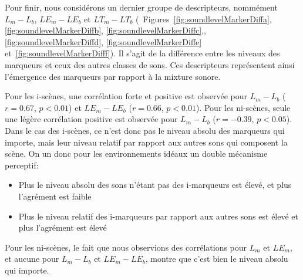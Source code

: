 Pour finir, nous considérons un dernier groupe de descripteurs, nommément $L_m-L_b$, $LE_m-LE_b$ et $LT_m-LT_b$ (\Cf~Figures~\ref{fig:soundlevelMarkerDiffa}, \ref{fig:soundlevelMarkerDiffb}, \ref{fig:soundlevelMarkerDiffc},, \ref{fig:soundlevelMarkerDiffd}, \ref{fig:soundlevelMarkerDiffe} et~\ref{fig:soundlevelMarkerDifff}). Il s'agit de la différence entre les niveaux des marqueurs et ceux des autres classes de sons. Ces descripteurs représentent ainsi l’émergence des marqueurs par rapport à la mixture sonore. 

Pour les i-scènes, une corrélation forte et positive est observée pour $L_m-L_b$ ($r=0.67$, $p<0.01$) et $LE_m-LE_b$ ($r=0.66$, $p<0.01$). Pour les ni-scènes, seule une légère corrélation positive est observée pour $L_m-L_b$ ($r=-0.39$, $p<0.05$). Dans le cas des i-scènes, ce n'est donc pas le niveau absolu des marqueurs qui importe, mais leur niveau relatif par rapport aux autres sons qui composent la scène. On un donc pour les environnements idéaux un double mécanisme perceptif: 

\begin{itemize}
\item Plus le niveau absolu des sons n'étant pas des i-marqueurs est élevé, et plus l'agrément est faible
\item Plus le niveau relatif des i-marqueurs par rapport aux autres sons est élevé et plus l'agrément est élevé
\end{itemize}

Pour les ni-scènes, le fait que nous observions des corrélations pour $L_m$ et $LE_m$, et aucune pour $L_m-L_b$ et $LE_m-LE_b$, montre que c'est bien le niveau absolu qui importe.

